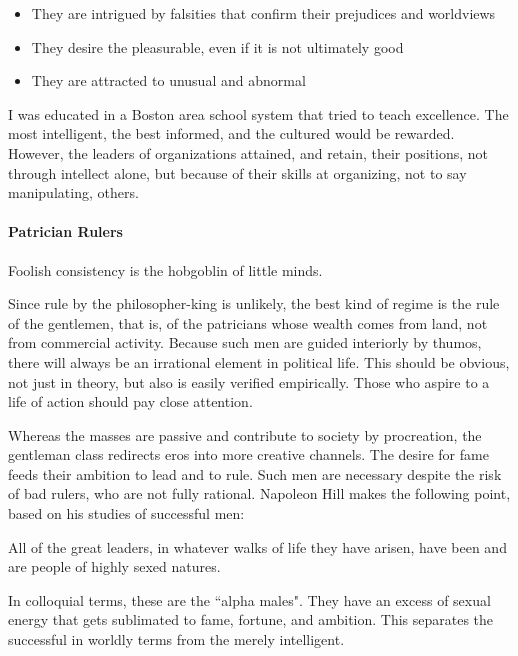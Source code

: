 \begin{itemize}
\item They are intrigued by falsities that confirm their prejudices and worldviews 
\item They desire the pleasurable, even if it is not ultimately good 
\item They are attracted to unusual and abnormal 
\end{itemize}
I was educated in a Boston area school system that tried to teach excellence. The most intelligent, the best informed, and the cultured would be rewarded. However, the leaders of organizations attained, and retain, their positions, not through intellect alone, but because of their skills at organizing, not to say manipulating, others.

\paragraph{Patrician Rulers}
\begin{quotex}
Foolish consistency is the hobgoblin of little minds. 

\end{quotex}
Since rule by the philosopher-king is unlikely, the best kind of regime is the rule of the gentlemen, that is, of the patricians whose wealth comes from land, not from commercial activity. Because such men are guided interiorly by thumos, there will always be an irrational element in political life. This should be obvious, not just in theory, but also is easily verified empirically. Those who aspire to a life of action should pay close attention.

Whereas the masses are passive and contribute to society by procreation, the gentleman class redirects eros into more creative channels. The desire for fame feeds their ambition to lead and to rule. Such men are necessary despite the risk of bad rulers, who are not fully rational. Napoleon Hill makes the following point, based on his studies of successful men:

\begin{quotex}
All of the great leaders, in whatever walks of life they have arisen, have been and are people of highly sexed natures. 

\end{quotex}
In colloquial terms, these are the ``alpha males". They have an excess of sexual energy that gets sublimated to fame, fortune, and ambition. This separates the successful in worldly terms from the merely intelligent.


